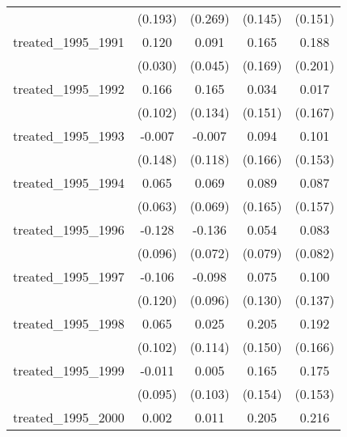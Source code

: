 {\begin{tabular}{l*{4}{c}}
            &     (0.193)         &     (0.269)         &     (0.145)         &     (0.151)         \\
[1em]
treated\_1995\_1991&       0.120\sym{***}&       0.091\sym{*}  &       0.165         &       0.188         \\
            &     (0.030)         &     (0.045)         &     (0.169)         &     (0.201)         \\
[1em]
treated\_1995\_1992&       0.166         &       0.165         &       0.034         &       0.017         \\
            &     (0.102)         &     (0.134)         &     (0.151)         &     (0.167)         \\
[1em]
treated\_1995\_1993&      -0.007         &      -0.007         &       0.094         &       0.101         \\
            &     (0.148)         &     (0.118)         &     (0.166)         &     (0.153)         \\
[1em]
treated\_1995\_1994&       0.065         &       0.069         &       0.089         &       0.087         \\
            &     (0.063)         &     (0.069)         &     (0.165)         &     (0.157)         \\
[1em]
treated\_1995\_1996&      -0.128         &      -0.136         &       0.054         &       0.083         \\
            &     (0.096)         &     (0.072)         &     (0.079)         &     (0.082)         \\
[1em]
treated\_1995\_1997&      -0.106         &      -0.098         &       0.075         &       0.100         \\
            &     (0.120)         &     (0.096)         &     (0.130)         &     (0.137)         \\
[1em]
treated\_1995\_1998&       0.065         &       0.025         &       0.205         &       0.192         \\
            &     (0.102)         &     (0.114)         &     (0.150)         &     (0.166)         \\
[1em]
treated\_1995\_1999&      -0.011         &       0.005         &       0.165         &       0.175         \\
            &     (0.095)         &     (0.103)         &     (0.154)         &     (0.153)         \\
[1em]
treated\_1995\_2000&       0.002         &       0.011         &       0.205         &       0.216         \\

\end{tabular}}

